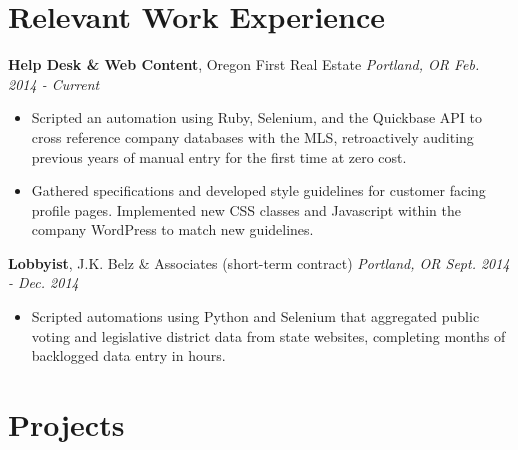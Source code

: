 \documentclass[11pt,line,centered]{res}
\begin{document}
\thispagestyle{footed}

\address{\tiny ddykes2@gmail.com | 971-238-4828 | github.com/rsq2}

\begin{resume}
\bigskip

\section{\sectionfont\normalsize Relevant Work Experience}
    \vspace{1em}

    \footnotesize{\bfseries Help Desk \& Web Content}, Oregon First Real Estate \hfill \textit{Portland, OR Feb. 2014 - Current}\\
        \vspace{-8mm}
        \begin{itemize}
            \setlength\itemsep{-1em}
            \item Scripted an automation using Ruby, Selenium, and the Quickbase API to cross reference company databases with the MLS,
                  retroactively auditing previous years of manual entry for the first time at zero cost.\\
            \item Gathered specifications and developed style guidelines for customer facing profile pages. Implemented new CSS classes
                  and Javascript within the company WordPress to match new guidelines.\\
        \end{itemize}
        \vspace{-2\topsep}

    \footnotesize{\bfseries Lobbyist}, J.K. Belz \& Associates (short-term contract) \hfill \textit{Portland, OR Sept. 2014 - Dec. 2014}\\
        \vspace{-8mm}
        \begin{itemize}
            \setlength\itemsep{-1em}
            \item Scripted automations using Python and Selenium that aggregated public voting and legislative district data from state
                  websites, completing months of backlogged data entry in hours. \\
        \end{itemize}

\section{\sectionfont\normalsize Projects}
    \vspace{1em}


\end{resume}
\end{document}
